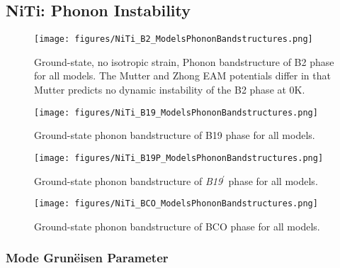\documentclass[preprint,colorlinks=true,linkcolor=black,citecolor=black]{elsarticle}
\begin{document}
\subsection{NiTi: Phonon Instability}
\label{subsec:nitiphonons}

\begin{figure}[!htp]
  \begin{centering}
    \texttt{[image: figures/NiTi\_B2\_ModelsPhononBandstructures.png]}
    \caption{ Ground-state, no isotropic strain, Phonon bandstructure
      of B2 phase for all models. The Mutter and Zhong EAM potentials
      differ in that Mutter predicts no dynamic instability of the B2
      phase at 0K.  }
    \label{fig:allmodels_b2}
  \end{centering}
\end{figure}

\begin{figure}[!htp]
  \begin{centering}
    \texttt{[image: figures/NiTi\_B19\_ModelsPhononBandstructures.png]}
    \caption{ Ground-state phonon bandstructure of B19 phase for all
      models.  }
    \label{fig:allmodels_B19P}
  \end{centering}
\end{figure}

\begin{figure}[!htp]
  \begin{centering}
    \texttt{[image: figures/NiTi\_B19P\_ModelsPhononBandstructures.png]}
    \caption{ Ground-state phonon bandstructure of
      \textit{B19}$^\prime$ phase for all models.  }
    \label{fig:allmodels_B19P}
  \end{centering}
\end{figure}


\begin{figure}[!htp]
  \begin{centering}
    \texttt{[image: figures/NiTi\_BCO\_ModelsPhononBandstructures.png]}
    \caption{ Ground-state phonon bandstructure of BCO phase for all
      models.  }
    \label{fig:allmodels_B19P}
  \end{centering}
\end{figure}


\subsubsection{Mode Grun\"{e}isen Parameter}
\end{document}
